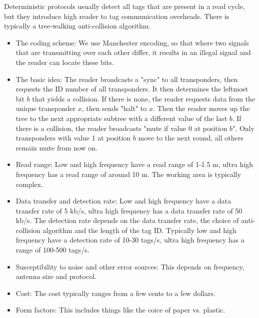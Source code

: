 
\begin{mytitle} Deterministic protocols usually detect all tags that are present in a read cycle, but they introduce high reader to tag communication overheads. There is typically a tree-walking anti-collision algorithm.
    \begin{mysubtitle} \hfill
    \begin{itemize}
        \item The coding scheme: We use Manchester encoding, so that where two signals that are transmitting over each other differ, it results in an illegal signal and the reader can locate these bits.
        \item The basic idea: The reader broadcasts a "sync" to all transponders, then requests the ID number of all transponders. It then determines the leftmost bit $b$ that yields a collision. If there is none, the reader requests data from the unique transponder $x$, then sends "halt" to $x$. Then the reader moves up the tree to the next appropriate subtree with a different value of the last $b$. If there is a collision, the reader broadcasts "mute if value 0 at position $b$". Only transponders with value 1 at position $b$ move to the next round, all others remain mute from now on.
    \end{itemize}
    \end{mysubtitle}
\end{mytitle}
\begin{mytitle} \hfill
\begin{itemize}
    \item Read range: Low and high frequency have a read range of 1-1.5 m, ultra high frequency has a read range of around 10 m. The working area is typically complex.
    \item Data transfer and detection rate: Low and high frequency have a data transfer rate of 5 kb/s, ultra high frequency has a data transfer rate of 50 kb/s. The detection rate depends on the data transfer rate, the choice of anti-collision algorithm and the length of the tag ID. Typically low and high frequency have a detection rate of 10-30 tags/s, ultra high frequency has a range of 100-500 tags/s.
    \item Susceptibility to noise and other error sources: This depends on frequency, antenna size and protocol.
    \item Cost: The cost typically ranges from a few cents to a few dollars.
    \item Form factors: This includes things like the coice of paper vs. plastic.
\end{itemize}
\end{mytitle}


